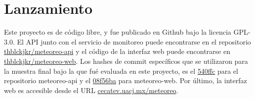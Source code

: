 \section{Lanzamiento}

Este proyecto es de código libre, y fue publicado en Github bajo la licencia GPL-3.0. El API junto con el servicio de monitoreo puede encontrarse en el repositorio \href{https://github.com/thblckjkr/meteoreo-api}{thblckjkr/meteoreo-api} y el código de la interfaz web puede encontrarse en \href{https://github.com/thblckjkr/meteoreo-web}{thblckjkr/meteoreo-web}. Los hashes de commit específicos que se utilizaron para la muestra final bajo la que fué evaluada en este proyecto, es el \href{https://github.com/thblckjkr/meteoreo-api/tree/540ffcf1a00a6ad57887ec69a6095b5636a29806}{540ffc} para el repositorio meteoreo-api y el \href{https://github.com/thblckjkr/meteoreo-web/tree/08f56ba9712b3392244634dcbf0060c205d13f4f}{08f56ba} para meteoreo-web. Por último, la interfaz web es accesible desde el URL \href{http://cecatev.uacj.mx/meteoreo}{cecatev.uacj.mx/meteoreo}.
